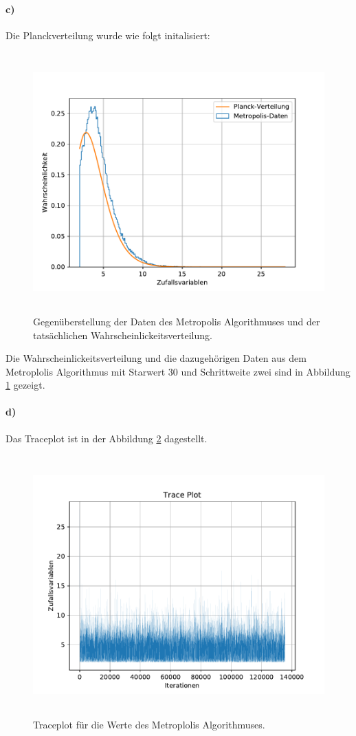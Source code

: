 \paragraph{c)}
Die Planckverteilung wurde wie folgt initalisiert:

\begin{figure}
  \centering
  \includegraphics[height = 10cm]{plots/Planckvergleich.pdf}
  \caption{Gegenüberstellung der Daten des Metropolis Algorithmuses und der tatsächlichen Wahrscheinlickeitsverteilung.}
  \label{fig:Pvgl}
\end{figure}
Die Wahrscheinlickeitsverteilung und die dazugehörigen Daten aus dem Metroplolis 
Algorithmus mit Starwert 30 und Schrittweite zwei sind in Abbildung \ref{fig:Pvgl} gezeigt.
\paragraph{d)}
Das Traceplot ist in der Abbildung \ref{fig:Trace} dagestellt.
\begin{figure}
  \centering
  \includegraphics[height = 10cm]{plots/Traceplot.pdf}
  \caption{Traceplot für die Werte des Metroplolis Algorithmuses.}
  \label{fig:Trace}
\end{figure}

